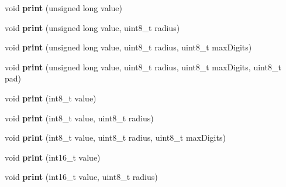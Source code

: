\begin{DoxyCompactItemize}
\item 
void {\bfseries print} (unsigned long value)\hypertarget{class_l_k_m1638_board_a7bcc87b42a36593c0dc25f96d35dd7b7}{}\label{class_l_k_m1638_board_a7bcc87b42a36593c0dc25f96d35dd7b7}

\item 
void {\bfseries print} (unsigned long value, uint8\+\_\+t radius)\hypertarget{class_l_k_m1638_board_a3ad79f70f43abe6cdd93e0820451ee2e}{}\label{class_l_k_m1638_board_a3ad79f70f43abe6cdd93e0820451ee2e}

\item 
void {\bfseries print} (unsigned long value, uint8\+\_\+t radius, uint8\+\_\+t max\+Digits)\hypertarget{class_l_k_m1638_board_a58d41caae5893ba5de7d0f0b1694e603}{}\label{class_l_k_m1638_board_a58d41caae5893ba5de7d0f0b1694e603}

\item 
void {\bfseries print} (unsigned long value, uint8\+\_\+t radius, uint8\+\_\+t max\+Digits, uint8\+\_\+t pad)\hypertarget{class_l_k_m1638_board_a4d85c9a6d46429371f53d48d88bcf098}{}\label{class_l_k_m1638_board_a4d85c9a6d46429371f53d48d88bcf098}

\item 
void {\bfseries print} (int8\+\_\+t value)\hypertarget{class_l_k_m1638_board_a3870dd214f2cf1f8fef72914caf6514f}{}\label{class_l_k_m1638_board_a3870dd214f2cf1f8fef72914caf6514f}

\item 
void {\bfseries print} (int8\+\_\+t value, uint8\+\_\+t radius)\hypertarget{class_l_k_m1638_board_a3ef6e7753b0bb41fce28beb6929ff322}{}\label{class_l_k_m1638_board_a3ef6e7753b0bb41fce28beb6929ff322}

\item 
void {\bfseries print} (int8\+\_\+t value, uint8\+\_\+t radius, uint8\+\_\+t max\+Digits)\hypertarget{class_l_k_m1638_board_a45e0efcafa18905ffbe54418c5bd9882}{}\label{class_l_k_m1638_board_a45e0efcafa18905ffbe54418c5bd9882}

\item 
void {\bfseries print} (int16\+\_\+t value)\hypertarget{class_l_k_m1638_board_a6a528db7d882c863343ebc3113121144}{}\label{class_l_k_m1638_board_a6a528db7d882c863343ebc3113121144}

\item 
void {\bfseries print} (int16\+\_\+t value, uint8\+\_\+t radius)\hypertarget{class_l_k_m1638_board_a4319c529f3c73460d711b9a1a4be7ca0}{}\label{class_l_k_m1638_board_a4319c529f3c73460d711b9a1a4be7ca0}


\end{DoxyCompactItemize}
